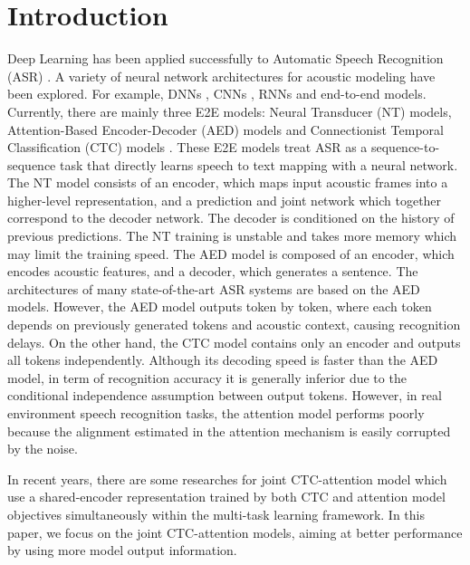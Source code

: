 \documentclass[a4paper]{article}
\begin{document}
\section{Introduction}
Deep Learning has been applied successfully to Automatic
Speech Recognition (ASR) \cite{Hinton2012DeepNN}. A variety of neural network architectures for acoustic modeling have been explored. For example, DNNs \cite{Dahl2012ContextDependentPD}, CNNs \cite{Sainath2013DeepCN}, RNNs \cite{Graves2013SpeechRW} and end-to-end models\cite{Graves2014TowardsES,Chan2016ListenAA,Bahdanau2016EndtoendAL,Chiu2018StateoftheArtSR}. 
Currently, there are mainly three E2E models: Neural Transducer (NT) \cite{gulati2020conformer,Graves2013SpeechRW,Graves2012SequenceTW,Rao2017ExploringAD} models, Attention-Based Encoder-Decoder (AED) models \cite{Chan2016ListenAA,Bahdanau2016EndtoendAL,Dong2018SpeechTransformerAN} and Connectionist Temporal Classification \cite{Graves2006ConnectionistTC} (CTC) models \cite{Graves2014TowardsES,Kriman2020QuartznetDA}. These E2E models treat ASR as a sequence-to-sequence task that directly learns speech to text mapping with a neural network. 
The NT model consists of an encoder, which maps input acoustic frames into a higher-level representation, and a prediction and joint network which together correspond to the decoder network\cite{Rao2017ExploringAD}. The decoder is conditioned on the history of previous predictions. The NT training is unstable and takes more memory which may limit the training speed.
The AED model is composed of an encoder, which encodes acoustic features, and a decoder, which generates a sentence. The architectures of many state-of-the-art ASR systems \cite{Karita2019ImprovingTE} are based on the AED models. However, the AED model outputs token by token, where each token depends on previously generated tokens and acoustic context, causing recognition delays. 
On the other hand, the CTC model contains only an encoder and outputs all tokens independently. Although its decoding speed is faster than the AED model, in term of recognition accuracy it is generally inferior due to the conditional independence assumption between output tokens. However, in real environment speech recognition tasks, the attention model performs poorly because the alignment estimated in the attention mechanism is easily corrupted by the noise. 

In recent years, there are some researches for joint CTC-attention model \cite{Kim2017JointCB,Zhang2020UnifiedSA} which use a shared-encoder representation trained by both CTC and attention model objectives simultaneously within the multi-task learning framework. In this paper, we focus on the joint CTC-attention models, aiming at better performance by using more model output information.
\end{document}
